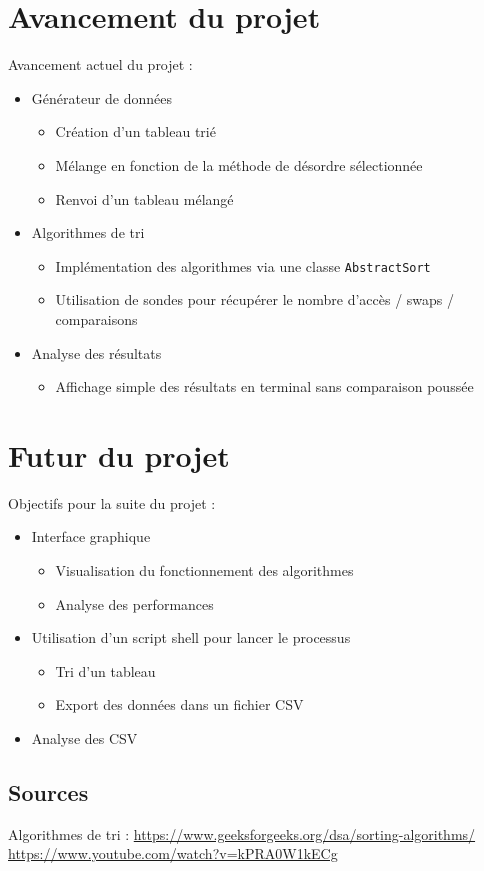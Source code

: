 \documentclass[10pt]{beamer}
\begin{document}
\section{Avancement du projet}
\begin{frame}
Avancement actuel du projet :
  \begin{itemize}
    \item <1-> Générateur de données 
      \begin{itemize}
        \item Création d’un tableau trié 
        \item Mélange en fonction de la méthode de désordre sélectionnée 
        \item Renvoi d’un tableau mélangé  
      \end{itemize}
    \item <2-> Algorithmes de tri 
        \begin{itemize}
          \item Implémentation des algorithmes via une classe \texttt{AbstractSort}
          \item Utilisation de sondes pour récupérer le nombre d’accès / swaps / comparaisons
        \end{itemize}
    \item <3-> Analyse des résultats
      \begin{itemize}
        \item Affichage simple des résultats en terminal sans comparaison poussée
      \end{itemize}
  \end{itemize}
\end{frame}

\section{Futur du projet}
\begin{frame}
Objectifs pour la suite du projet :
  \begin{itemize}
    \item Interface graphique 
    \begin{itemize}
      \item Visualisation du fonctionnement des algorithmes 
      \item Analyse des performances
    \end{itemize}
    \item Utilisation d’un script shell pour lancer le processus 
    \begin{itemize}
      \item Tri d’un tableau
      \item Export des données dans un fichier CSV
    \end{itemize}
    \item Analyse des CSV
  \end{itemize}
\end{frame}

\begin{frame}
\section{Sources}
  Algorithmes de tri : \url{https://www.geeksforgeeks.org/dsa/sorting-algorithms/}
  \newline
  \url{https://www.youtube.com/watch?v=kPRA0W1kECg}
\end{frame}
\end{document}
